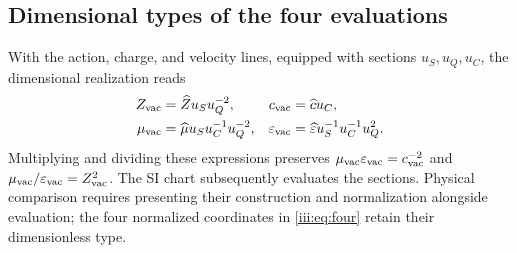 \subsection{Dimensional types of the four evaluations}

With the action, charge, and velocity lines, equipped with sections
$u_S,u_Q,u_C$, the dimensional realization reads
\begin{align}
 Z_{\rm vac}&=\widehat Z u_Su_Q^{-2},&
 c_{\rm vac}&=\widehat c u_C,\\
 \mu_{\rm vac}&=\widehat\mu u_Su_C^{-1}u_Q^{-2},&
 \varepsilon_{\rm vac}&=\widehat\varepsilon u_S^{-1}u_C^{-1}u_Q^2.
 \label{iii:eq:dimensions}
\end{align}
Multiplying and dividing these expressions preserves
$\mu_{\rm vac}\varepsilon_{\rm vac}=c_{\rm vac}^{-2}$ and
$\mu_{\rm vac}/\varepsilon_{\rm vac}=Z_{\rm vac}^2$.
The SI chart subsequently evaluates the sections. Physical comparison requires
presenting their construction and normalization alongside evaluation; the four
normalized coordinates in \eqref{iii:eq:four} retain their dimensionless type.
